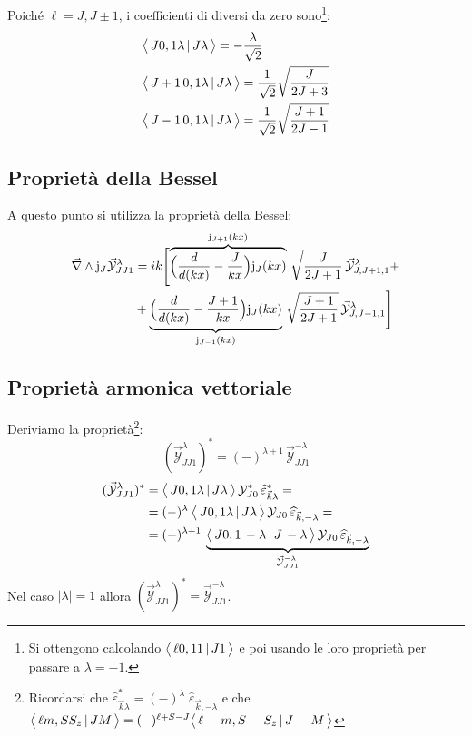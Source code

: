 \subsection{\CG}
Poiché $\ell = J, J\pm 1$, i coefficienti di \CG diversi da zero sono\footnote{Si ottengono calcolando $\bigl\langle\, \ell 0, 1 1\, |\, J1\, \bigr\rangle$ e poi usando le loro proprietà per passare a $\lambda = -1$.}:
\begin{align*}
	&\bigl\langle\, J0,1\lambda\, |\, J\lambda\, \bigr\rangle = - \frac{\lambda}{\sqrt{2}}\\
	&\bigl\langle\, J+1\,0,1\lambda\, |\, J\lambda\, \bigr\rangle = \frac{1}{\sqrt{2}} \sqrt{\frac{J}{2J+3}}\\
	&\bigl\langle\, J-1\,0,1\lambda\, |\, J\lambda\, \bigr\rangle = \frac{1}{\sqrt{2}} \sqrt{\frac{J+1}{2J-1}}
\end{align*}
\subsection{Proprietà della Bessel}
A questo punto si utilizza la proprietà della Bessel:
\begin{align*}
	\vec{\nabla}\land\mathrm{j}_J\vec{\mathcal{Y}}_{JJ1}^\lambda &= ik \Biggl [ \overbrace{\Bigl ( \frac{d}{d(kx)} - \frac{J}{kx} \Bigr ) \mathrm{j}_{J}(kx) }^{\mathrm{j}_{J+1}(kx)}\, \sqrt{\frac{J}{2J+1}}\, \vec{\mathcal{Y}}_{J,J+1,1}^\lambda + \\
	&+ \underbrace{\Bigl ( \frac{d}{d(kx)} - \frac{J+1}{kx} \Bigr ) \mathrm{j}_{J}(kx) }_{\mathrm{j}_{J-1}(kx)}\, \sqrt{\frac{J+1}{2J+1}}\, \vec{\mathcal{Y}}_{J,J-1,1}^\lambda \Biggr ]
\end{align*}
\subsection{Proprietà armonica vettoriale}\label{compl-passaggi-armonica}
Deriviamo la proprietà\footnote{Ricordarsi che $\widehat{\varepsilon}_{\vec{k}\lambda}^* = (-)^\lambda \; \widehat{\varepsilon}_{\vec{k},-\lambda}$ e che $\bigl\langle\, \ell m, S S_z\, |\, J M\, \bigr\rangle = (-)^{\ell+S-J} \bigl\langle\, \ell\, -m, S\, -S_z\, |\, J \,-M\, \bigr\rangle $}:
$$(\vec{\mathcal{Y}}_{JJ1}^\lambda)^* = (-)^{\lambda+1}\,\vec{\mathcal{Y}}^{-\lambda}_{JJ1}$$
\begin{align*}
	(\vec{\mathcal{Y}}_{JJ1}^\lambda)^* &= \bigl\langle\, J0,1\lambda\, |\, J\lambda\, \bigr\rangle \, \mathcal{Y}_{J0}^* \, \widehat{\varepsilon}_{\vec{k}\lambda}^* = \\
	&= (-)^\lambda \: \bigl\langle\, J0,1\lambda\, |\, J\lambda\, \bigr\rangle \, \mathcal{Y}_{J0} \, \widehat{\varepsilon}_{\vec{k},-\lambda} = \\
	&= (-)^{\lambda+1} \: \underbrace{\bigl\langle\, J0,1\,-\lambda\, |\, J\,-\lambda\, \bigr\rangle \, \mathcal{Y}_{J0} \, \widehat{\varepsilon}_{\vec{k},-\lambda}}_{\vec{\mathcal{Y}}_{JJ1}^{-\lambda}}
\end{align*}
Nel caso $|\lambda|=1$ allora $(\vec{\mathcal{Y}}_{JJ1}^\lambda)^* = \vec{\mathcal{Y}}_{JJ1}^{-\lambda}$.

